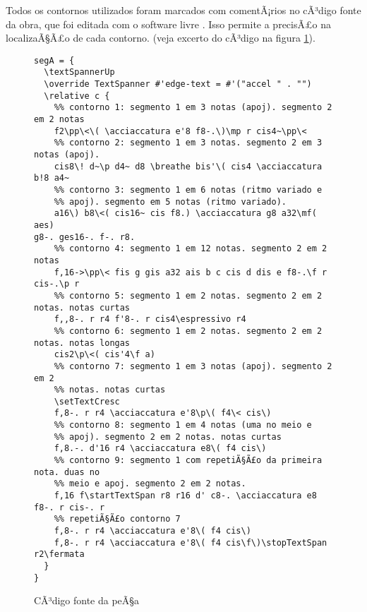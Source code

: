 \documentclass[12pt]{article}
\begin{document}
Todos os contornos utilizados foram marcados com comentÃ¡rios no cÃ³digo
fonte da obra, que foi editada com o software livre 
\cite{Nienhuys2007}. Isso permite a precisÃ£o na localizaÃ§Ã£o de cada
contorno. (veja excerto do cÃ³digo na figura \ref{fig:codigo}).

\begin{figure}[h]
  \centering
\begin{verbatim}
segA = {
  \textSpannerUp
  \override TextSpanner #'edge-text = #'("accel " . "")
  \relative c {
    %% contorno 1: segmento 1 em 3 notas (apoj). segmento 2 em 2 notas
    f2\pp\<\( \acciaccatura e'8 f8-.\)\mp r cis4~\pp\<
    %% contorno 2: segmento 1 em 3 notas. segmento 2 em 3 notas (apoj).
    cis8\! d~\p d4~ d8 \breathe bis'\( cis4 \acciaccatura b!8 a4~
    %% contorno 3: segmento 1 em 6 notas (ritmo variado e
    %% apoj). segmento em 5 notas (ritmo variado).
    a16\) b8\<( cis16~ cis f8.) \acciaccatura g8 a32\mf( aes)
g8-. ges16-. f-. r8.
    %% contorno 4: segmento 1 em 12 notas. segmento 2 em 2 notas
    f,16->\pp\< fis g gis a32 ais b c cis d dis e f8-.\f r cis-.\p r
    %% contorno 5: segmento 1 em 2 notas. segmento 2 em 2 notas. notas curtas
    f,,8-. r r4 f'8-. r cis4\espressivo r4
    %% contorno 6: segmento 1 em 2 notas. segmento 2 em 2 notas. notas longas
    cis2\p\<( cis'4\f a)
    %% contorno 7: segmento 1 em 3 notas (apoj). segmento 2 em 2
    %% notas. notas curtas
    \setTextCresc
    f,8-. r r4 \acciaccatura e'8\p\( f4\< cis\)
    %% contorno 8: segmento 1 em 4 notas (uma no meio e
    %% apoj). segmento 2 em 2 notas. notas curtas
    f,8.-. d'16 r4 \acciaccatura e8\( f4 cis\)
    %% contorno 9: segmento 1 com repetiÃ§Ã£o da primeira nota. duas no
    %% meio e apoj. segmento 2 em 2 notas.
    f,16 f\startTextSpan r8 r16 d' c8-. \acciaccatura e8 f8-. r cis-. r
    %% repetiÃ§Ã£o contorno 7
    f,8-. r r4 \acciaccatura e'8\( f4 cis\)
    f,8-. r r4 \acciaccatura e'8\( f4 cis\f\)\stopTextSpan r2\fermata
  }
}
\end{verbatim}
  \caption{CÃ³digo fonte da peÃ§a}
  \label{fig:codigo}
\end{figure}



\end{document}
